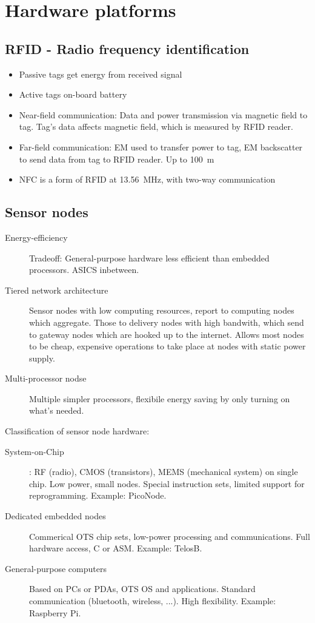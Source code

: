 \section{Hardware platforms}

\subsection{RFID - Radio frequency identification}

\begin{itemize}
		\item Passive tags get energy from received signal
		\item Active tags on-board battery
		\item Near-field communication: Data and power transmission via
				magnetic field to tag. Tag's data affects magnetic field, which
				is measured by RFID reader.
		\item Far-field communication: EM used to transfer power to tag, EM
				backscatter to send data from tag to RFID reader. Up to
				\SI{100}{\meter}
		\item NFC is a form of RFID at \SI{13.56}{\mega\Hz}, with two-way communication
\end{itemize}

\subsection{Sensor nodes}

\begin{description}
		\item[Energy-efficiency] Tradeoff: General-purpose hardware less efficient than embedded
				processors. ASICS inbetween.
		\item[Tiered network architecture] Sensor nodes with low computing
				resources, report to computing nodes which aggregate. Those to
				delivery nodes with high bandwith, which send to gateway nodes
				which are hooked up to the internet. Allows most nodes to be
				cheap, expensive operations to take place at nodes with static
				power supply.
		\item[Multi-processor nodse] Multiple simpler processors, flexibile
				energy saving by only turning on what's needed.
\end{description}

Classification of sensor node hardware:
\begin{description}
		\item[System-on-Chip]: RF (radio), CMOS (transistors), MEMS (mechanical
				system) on single chip. Low power, small nodes. Special
				instruction sets, limited support for reprogramming. Example: PicoNode.
		\item[Dedicated embedded nodes] Commerical OTS chip sets, low-power
				processing and communications. Full hardware access, C or ASM.
				Example: TelosB.
		\item[General-purpose computers] Based on PCs or PDAs, OTS OS and
				applications. Standard communication (bluetooth, wireless,
				...). High flexibility. Example: Raspberry Pi.
\end{description}



